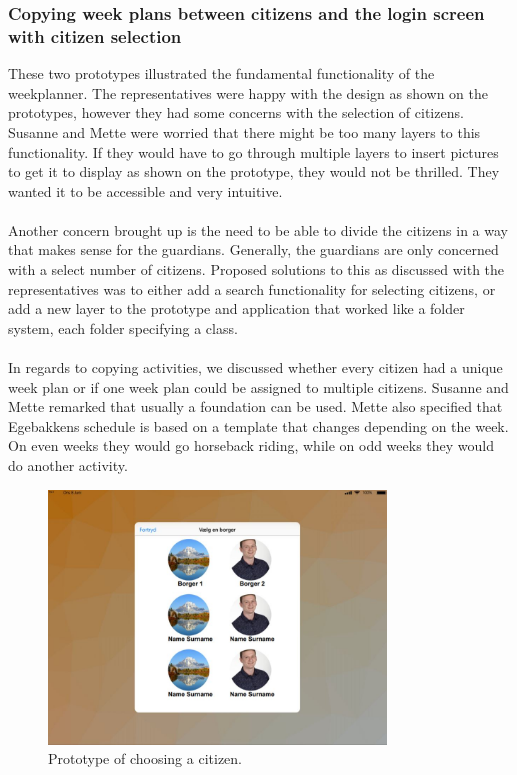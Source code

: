 \subsubsection{Copying week plans between citizens and the login screen with citizen selection}
These two prototypes illustrated the fundamental functionality of the weekplanner.
The representatives were happy with the design as shown on the prototypes, however they had some concerns with the selection of citizens.
Susanne and Mette were worried that there might be too many layers to this functionality.
If they would have to go through multiple layers to insert pictures to get it to display as shown on the prototype, they would not be thrilled.
They wanted it to be accessible and very intuitive.
\\\\
Another concern brought up is the need to be able to divide the citizens in a way that makes sense for the guardians.
Generally, the guardians are only concerned with a select number of citizens.
Proposed solutions to this as discussed with the representatives was to either add a search functionality for selecting citizens, or add a new layer to the prototype and application that worked like a folder system, each folder specifying a class.
\\\\
In regards to copying activities, we discussed whether every citizen had a unique week plan or if one week plan could be assigned to multiple citizens.
Susanne and Mette remarked that usually a foundation can be used.
Mette also specified that Egebakkens schedule is based on a template that changes depending on the week.
On even weeks they would go horseback riding, while on odd weeks they would do another activity.

\begin{figure}[!htb]
    \center
    \includegraphics[width=0.8\textwidth]{figures/select-citizen.JPG}
    \caption{\label{fig:choose-citizen-prototype} Prototype of choosing a citizen.}
\end{figure}

